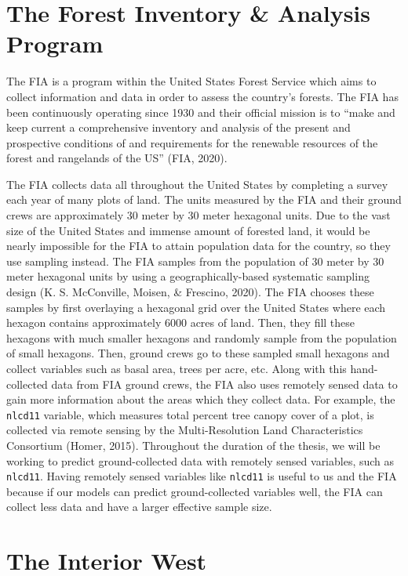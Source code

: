 \documentclass[12pt,twoside]{reedthesis}
\begin{document}
\hypertarget{the-forest-inventory-analysis-program}{%
\section{The Forest Inventory \& Analysis Program}\label{the-forest-inventory-analysis-program}}

The FIA is a program within the United States Forest Service which aims to collect information and data in order to assess the country's forests. The FIA has been continuously operating since 1930 and their official mission is to ``make and keep current a comprehensive inventory and analysis of the present and prospective conditions of and requirements for the renewable resources of the forest and rangelands of the US'' (FIA, 2020).

The FIA collects data all throughout the United States by completing a survey each year of many plots of land. The units measured by the FIA and their ground crews are approximately 30 meter by 30 meter hexagonal units. Due to the vast size of the United States and immense amount of forested land, it would be nearly impossible for the FIA to attain population data for the country, so they use sampling instead. The FIA samples from the population of 30 meter by 30 meter hexagonal units by using a geographically-based systematic sampling design (K. S. McConville, Moisen, \& Frescino, 2020). The FIA chooses these samples by first overlaying a hexagonal grid over the United States where each hexagon contains approximately 6000 acres of land. Then, they fill these hexagons with much smaller hexagons and randomly sample from the population of small hexagons. Then, ground crews go to these sampled small hexagons and collect variables such as basal area, trees per acre, etc. Along with this hand-collected data from FIA ground crews, the FIA also uses remotely sensed data to gain more information about the areas which they collect data. For example, the \texttt{nlcd11} variable, which measures total percent tree canopy cover of a plot, is collected via remote sensing by the Multi-Resolution Land Characteristics Consortium (Homer, 2015). Throughout the duration of the thesis, we will be working to predict ground-collected data with remotely sensed variables, such as \texttt{nlcd11}. Having remotely sensed variables like \texttt{nlcd11} is useful to us and the FIA because if our models can predict ground-collected variables well, the FIA can collect less data and have a larger effective sample size.

\hypertarget{the-interior-west}{%
\section{The Interior West}\label{the-interior-west}}
\end{document}
